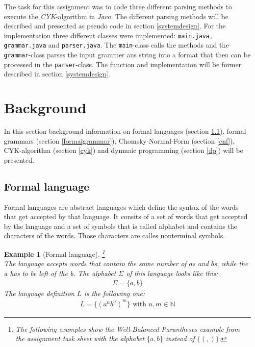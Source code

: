\documentclass[a4paper, 11pt]{article}
\newtheorem*{example*}{Example}
\begin{document}
The task for this assignment was to code three different parsing methods to execute the \textit{CYK}-algorithm in \textit{Java}. The different parsing methods will be described and presented as pseudo code in section \ref{systemdesign}.
For the implementation three different classes were implemented: \texttt{main.java, grammar.java} and \texttt{parser.java}. The \texttt{main}-class calls the methods and the \texttt{grammar}-class parses the input grammer ans string into a format that then can be processed in the \texttt{parser}-class.
The function and implementation will be former described in section \ref{systemdesign}.




\pagebreak














\section{Background}

In this section background information on formal languages (section \ref{formallanguage}), formal grammars (section \ref{formalgrammar}), Chomsky-Normal-Form (section \ref{cnf}), CYK-algorithm (section \ref{cyk}) and dynmaic programming (section \ref{dp}) will be presented. 


\subsection{Formal language}
\label{formallanguage}
Formal languages are abstract languages which define the syntax of the words that get accepted by that language. It consits of a set of words that get accepted by the language and a set of symbols that is called alphabet and contains the characters of the words. Those characters are calles nonterminal symbols. \cite{CNF, language}

\begin{example*}[Formal language]
\footnote{The following examples show the \textit{Well-Balanced Parantheses} example from the assignment task sheet with the alphabet $\{a, b\}$ instead of $\{(, )\}$. }
\\
The language accepts words that contain the same number of $a$s and $b$s, while the a has to be left of the b. 
The alphabet $\Sigma$ of this language looks like this:
\begin{align*}
\Sigma = \{ a, b\}
\end{align*}
The language definition $L$ is the following one:
\begin{align*}
L = \{ (a^{n}b^{n})^m \} \text{ with } n, m \in \mathbb{N}
\end{align*}

\end{example*}
\end{document}
